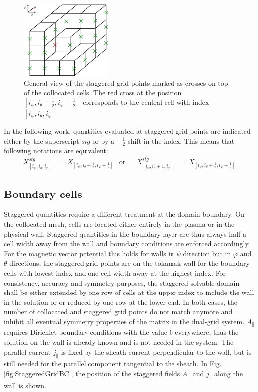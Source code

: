 \begin{figure}[H]
	\centering
	\includegraphics[width=0.4\textwidth]{schemes/StaggeredGrid.pdf}
	\caption[General view of the staggered grid points marked as crosses on top of the collocated cells]{General view of the staggered grid points marked as crosses on top of the collocated cells. The red cross at the position $[i_\psi, i_\theta - \frac{1}{2}, i_\varphi-\frac{1}{2}]$ corresponds to the central cell with index $[i_\psi, i_\theta, i_\varphi]$}
	\label{fig:StaggeredGridOverview}
\end{figure}

In the following work, quantities evaluated at staggered grid points are indicated either by the superscript $stg$ or by a $-\frac{1}{2}$ shift in the index. This means that following notations are equivalent: 
\begin{align*}
	X^{stg}_{[i_\psi,i_\theta,i_\varphi]} &= X_{[i_\psi,i_\theta-\frac{1}{2},i_\varphi-\frac{1}{2}]} &\text{or}&& X^{stg}_{[i_\psi,i_\theta+1,i_\varphi]} &= X_{[i_\psi,i_\theta+\frac{1}{2},i_\varphi-\frac{1}{2}]}
\end{align*}



\subsection{Boundary cells}

Staggered quantities require a different treatment at the domain boundary. On the collocated mesh, cells are located either entirely in the plasma or in the physical wall. Staggered quantities in the boundary layer are thus always half a cell width away from the wall and boundary conditions are enforced accordingly. For the magnetic vector potential this holds for walls in $\psi$ direction but in $\varphi$ and $\theta$ directions, the staggered grid points are on the tokamak wall for the boundary cells with lowest index and one cell width away at the highest index. For consistency, accuracy and symmetry purposes, the staggered solvable domain shall be either extended by one row of cells at the upper index to include the wall in the solution or or reduced by one row at the lower end. In both cases, the number of collocated and staggered grid points do not match anymore and inhibit all eventual symmetry properties of the matrix in the dual-grid system. $A_\parallel$ requires Dirichlet boundary conditions with the value 0 everywhere, thus the solution on the wall is already known and is not needed in the system. The parallel current $j_\parallel$ is fixed by the sheath current perpendicular to the wall, but is still needed for the parallel component tangential to the sheath. In Fig. \ref{fig:StaggeredGridBC}, the position of the staggered fields $A_\parallel$ and $j_\parallel$ along the wall is shown.


